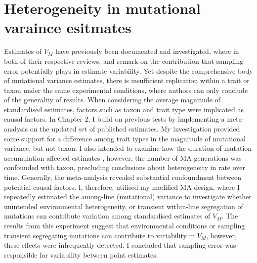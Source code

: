 \section{Heterogeneity in mutational varaince esitmates}
Estimates of $V_M$ have previously been documented and investigated, where in both of their respective reviews, \citet{Lync99} and \citet{Houl96} remark on the contribution that sampling error potentially plays in estimate variability. Yet despite the comprehensive body of mutational variance estimates, there is insufficient replication within a trait or taxon under the same experimental conditions, where authors can only conclude of the generality of results. When considering the average magnitude of standardised estimates, factors such as taxon \citep{Lync99, Hall09} and trait type \citep{Houl96, Houl98} were implicated as causal factors. In Chapter 2, I build on previous tests by implementing a meta-analysis on the updated set of published estimates. My investigation provided some support for a difference among trait types in the magnitude of mutational variance, but not taxon. I also intended to examine how the duration of mutation accumulation affected estimates \citep{Lync86,Mack95}, however, the number of MA generations was confounded with taxon, precluding conclusions about heterogeneity in rate over time. Generally, the meta-analysis revealed substantial confoundment between potential causal factors. I, therefore, utilised my modified MA design, where I repeatedly estimated the among-line (mutational) variance to investigate whether unintended environmental heterogeneity, or transient within-line segregation of mutations can contribute variation among standardised estimates of $V_M$. The results from this experiment suggest that environmental conditions or sampling transient segregating mutations can contribute to variability in $V_M$, however, these effects were infrequently detected. I concluded that sampling error was responsible for variability between point estimates. \par

